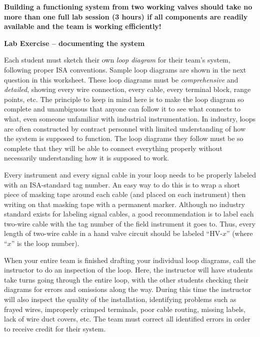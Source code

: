 \begin{itemize}
\vskip 10pt

{\bf Building a functioning system from two working valves should take no more than one full lab session (3 hours) if all components are readily available and the team is working efficiently!}





\vfil \eject

\noindent
{\bf Lab Exercise -- documenting the system}

\vskip 5pt

Each student must sketch their own {\it loop diagram} for their team's system, following proper ISA conventions.  Sample loop diagrams are shown in the next question in this worksheet.  These loop diagrams must be {\it comprehensive} and {\it detailed}, showing every wire connection, every cable, every terminal block, range points, etc.  The principle to keep in mind here is to make the loop diagram so complete and unambiguous that anyone can follow it to see what connects to what, even someone unfamiliar with industrial instrumentation.  In industry, loops are often constructed by contract personnel with limited understanding of how the system is supposed to function.  The loop diagrams they follow must be so complete that they will be able to connect everything properly without necessarily understanding how it is supposed to work.

Every instrument and every signal cable in your loop needs to be properly labeled with an ISA-standard tag number.  An easy way to do this is to wrap a short piece of masking tape around each cable (and placed on each instrument) then writing on that masking tape with a permanent marker.  Although no industry standard exists for labeling signal cables, a good recommendation is to label each two-wire cable with the tag number of the field instrument it goes to.  Thus, every length of two-wire cable in a hand valve circuit should be labeled ``HV-$x$'' (where ``$x$'' is the loop number).  

When your entire team is finished drafting your individual loop diagrams, call the instructor to do an inspection of the loop.  Here, the instructor will have students take turns going through the entire loop, with the other students checking their diagrams for errors and omissions along the way.  During this time the instructor will also inspect the quality of the installation, identifying problems such as frayed wires, improperly crimped terminals, poor cable routing, missing labels, lack of wire duct covers, etc.  The team must correct all identified errors in order to receive credit for their system.  


\end{itemize}

